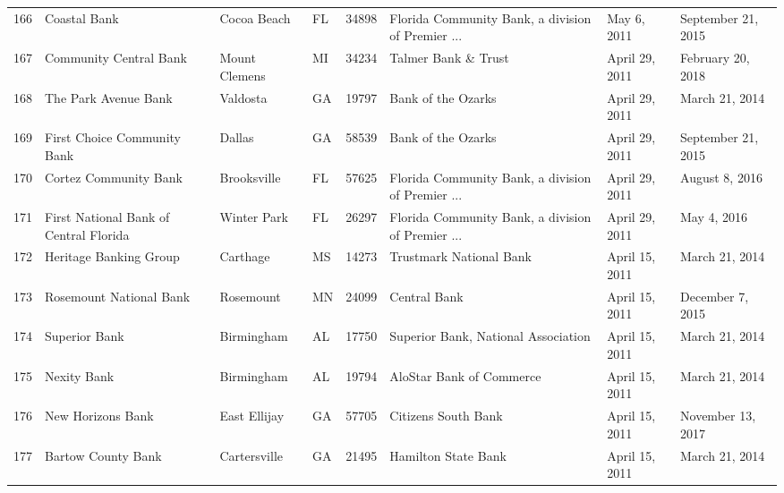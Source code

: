 \begin{tabular}{llllrlll}
166 &                                       Coastal Bank &         Cocoa Beach &  FL &  34898 &  Florida Community Bank, a division of Premier ... &         May 6, 2011 &  September 21, 2015 \\
167 &                             Community Central Bank &       Mount Clemens &  MI &  34234 &                                Talmer Bank \& Trust &      April 29, 2011 &   February 20, 2018 \\
168 &                               The Park Avenue Bank &            Valdosta &  GA &  19797 &                                 Bank of the Ozarks &      April 29, 2011 &      March 21, 2014 \\
169 &                        First Choice Community Bank &              Dallas &  GA &  58539 &                                 Bank of the Ozarks &      April 29, 2011 &  September 21, 2015 \\
170 &                              Cortez Community Bank &         Brooksville &  FL &  57625 &  Florida Community Bank, a division of Premier ... &      April 29, 2011 &      August 8, 2016 \\
171 &             First National Bank of Central Florida &         Winter Park &  FL &  26297 &  Florida Community Bank, a division of Premier ... &      April 29, 2011 &         May 4, 2016 \\
172 &                             Heritage Banking Group &            Carthage &  MS &  14273 &                            Trustmark National Bank &      April 15, 2011 &      March 21, 2014 \\
173 &                            Rosemount National Bank &           Rosemount &  MN &  24099 &                                       Central Bank &      April 15, 2011 &    December 7, 2015 \\
174 &                                      Superior Bank &          Birmingham &  AL &  17750 &                Superior Bank, National Association &      April 15, 2011 &      March 21, 2014 \\
175 &                                        Nexity Bank &          Birmingham &  AL &  19794 &                           AloStar Bank of Commerce &      April 15, 2011 &      March 21, 2014 \\
176 &                                  New Horizons Bank &        East Ellijay &  GA &  57705 &                                Citizens South Bank &      April 15, 2011 &   November 13, 2017 \\
177 &                                 Bartow County Bank &        Cartersville &  GA &  21495 &                                Hamilton State Bank &      April 15, 2011 &      March 21, 2014 \\

\end{tabular}
